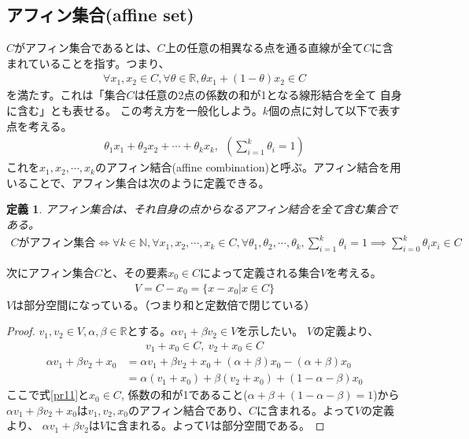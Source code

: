 \documentclass[a4paper, 10pt, notitlepage, uplatex]{jsreport}
\newtheorem{define}{定義}
\begin{document}
\subsection{アフィン集合(affine set)}
$C$がアフィン集合であるとは、$C$上の任意の相異なる点を通る直線が全て$C$に含まれていることを指す。つまり、
\begin{align*}
\forall x_1,x_2 \in C, \forall \theta \in \mathbb{R}, \theta x_1+(1-\theta) x_2 \in C
\end{align*}
を満たす。これは「集合$C$は任意の2点の係数の和が1となる線形結合を全て 自身に含む」とも表せる。
この考え方を一般化しよう。$k$個の点に対して以下で表す点を考える。
\begin{align*}
  \theta_1 x_1 + \theta_2 x_2 + \cdots + \theta_k x_k, \ \ \left(\sum_{i=1}^k \theta_i = 1\right)
\end{align*}
これを$x_1,x_2,\cdots,x_k$のアフィン結合(affine combination)と呼ぶ。アフィン結合を用いることで、アフィン集合は次のように定義できる。
\begin{define}
アフィン集合は、それ自身の点からなるアフィン結合を全て含む集合である。
\begin{align*}
  C\mbox{がアフィン集合} 
    \iff \forall k \in \mathbb{N},
    \forall x_1,x_2,\cdots,x_k \in C,
    \forall \theta_1,\theta_2,\cdots,\theta_k, 
      \sum_{i=1}^k \theta_i = 1 \implies \sum_{i=0}^k \theta_i x_i \in C
\end{align*}
\end{define}
次にアフィン集合$C$と、その要素$x_0 \in C $によって定義される集合$V$を考える。
\begin{align*}
 V = C-x_0 = \{x - x_0 | x \in C\}
\end{align*}
$V$は部分空間になっている。（つまり和と定数倍で閉じている）
\begin{proof}
$v_1,v_2 \in V, \alpha,\beta \in \mathbb{R}$とする。$\alpha v_1 + \beta v_2 \in V$を示したい。 $V$の定義より、
\begin{align}
  v_1+x_0 \in C,\ v_2+x_0 \in C \label{pr11}
\end{align}
\begin{align*}
\alpha v_1 + \beta v_2 + x_0 &= \alpha v_1 + \beta v_2 + x_0 +(\alpha+\beta)x_0 -(\alpha+\beta)x_0\\
&= \alpha(v_1+x_0) + \beta (v_2+x_0) + (1-\alpha-\beta)x_0     
\end{align*}
ここで式\eqref{pr11}と$x_0 \in C$, 係数の和が1であること($\alpha + \beta + (1-\alpha-\beta) = 1$)から \\ 
$\alpha v_1 + \beta v_2 + x_0$は$v_1,v_2,x_0$のアフィン結合であり、$C$に含まれる。よって$V$の定義より、
$\alpha v_1 + \beta v_2 $は$V$に含まれる。よって$V$は部分空間である。
\end{proof}
\end{document}
